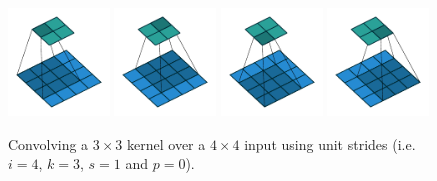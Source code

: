 \documentclass{report}
\begin{document}
\begin{figure}[p]
    \centering
    \includegraphics[width=0.24\textwidth]{pdf/no_padding_no_strides_00.pdf}
    \includegraphics[width=0.24\textwidth]{pdf/no_padding_no_strides_01.pdf}
    \includegraphics[width=0.24\textwidth]{pdf/no_padding_no_strides_02.pdf}
    \includegraphics[width=0.24\textwidth]{pdf/no_padding_no_strides_03.pdf}
    \caption{\label{fig:no_padding_no_strides} Convolving a $3 \times 3$ kernel
        over a $4 \times 4$ input using unit strides (i.e. $i = 4$, $k = 3$,
        $s = 1$ and $p = 0$).}
\end{figure}
\end{document}
